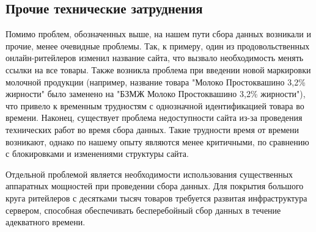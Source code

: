 \subsection{Прочие технические затруднения}\label{subsec:ch2/sec3/sub2}

Помимо проблем, обозначенных выше, на нашем пути сбора данных возникали и прочие, менее очевидные проблемы. Так, к примеру, один из продовольственных онлайн-ритейлеров изменил название сайта, что вызвало необходимость менять ссылки на все товары. Также возникла проблема при введении новой маркировки молочной продукции (например, название товара "Молоко Простоквашино 3,2\% жирности" было заменено на "БЗМЖ Молоко Простоквашино 3,2\% жирности"), что привело к временным трудностям с однозначной идентификацией товара во времени. Наконец, существует проблема недоступности сайта из-за проведения технических работ во время сбора данных. Такие трудности время от времени возникают, однако по нашему опыту являются менее критичными, по сравнению с блокировками и изменениями структуры сайта.

Отдельной проблемой является необходимости использования существенных аппаратных мощностей при проведении сбора данных. Для покрытия большого круга ритейлеров с десятками тысяч товаров требуется развитая инфраструктура сервером, способная обеспечивать бесперебойный сбор данных в течение адекватного времени.





